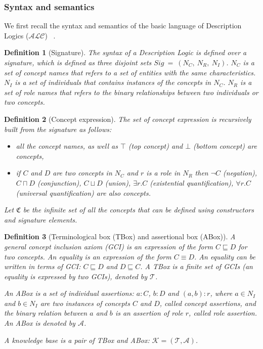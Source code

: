 \documentclass{article}
\newtheorem{mydef}{Definition}
\begin{document}
\subsubsection{Syntax and semantics}
We first recall the syntax and semantics of the basic language of Description Logics ($\mathcal{ALC}$) ~\cite{baader2003description}.
\begin{mydef}[Signature]
 The syntax of a Description Logic is defined over a signature, which is defined as three disjoint sets $Sig~=~(N_C,~N_R,~N_I)$. $N_C$ is a set of concept names that refers to a set of entities
 with the same characteristics. $N_I$ is a set of individuals that contains instances of the concepts in $N_C$.  $N_R$ is a set of role names that refers to the binary relationships between 
 two individuals or two concepts.
\end{mydef}


\begin{mydef}[Concept expression]
 The set of concept expression is recursively built from the signature as follows:
 \begin{itemize}
  \item all the concept names, as well as $\top$ (top concept) and $\bot$ (bottom concept) are concepts,
  \item if $C$ and $D$ are two concepts in $N_C$ and $r$ is a role in $N_R$
  then $\neg C$ (negation), $ C\sqcap D$ (conjunction), $ C\sqcup D$ (union), $ \exists r.C$ (existential quantification), $\forall r.C$ (universal quantification) are also concepts.
 \end{itemize}
 Let $\mathfrak{C}$ be the infinite set of all the concepts that can be defined using constructors and signature elements.
\end{mydef}


\begin{mydef}[Terminological box (TBox) and assertional box (ABox)]
A general concept inclusion axiom (GCI) is an expression of the form $C\sqsubseteq D$ for two  concepts. 
An equality is an expression of the form $C\equiv D$. An equality can be written in terms of GCI: $C\sqsubseteq D$ and $D\sqsubseteq C$.
A TBox is a finite set of GCIs (an equality is expressed by two GCIs), denoted by $\mathcal{T}$.

An ABox is a set of individual assertions: $a:C$, $b:D$ and $(a,b):r$, where $a\in N_I$ and $b\in N_I$ are two instances of concepts $C$ and $D$, called concept assertions, and
the binary relation between $a$ and $b$ is an assertion of role $r$, called role assertion. An ABox is denoted by $\mathcal{A}$.

A knowledge base is a pair of TBox and ABox: $\mathcal{K}=(\mathcal{T},\mathcal{A})$.
\end{mydef}
\end{document}
